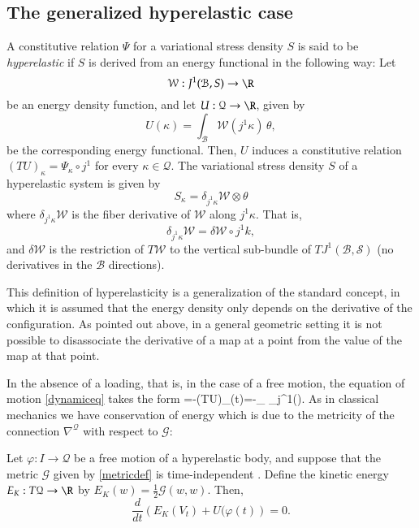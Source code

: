 \documentclass[smallextended]{svjour3}
\begin{document}
\subsection{The generalized hyperelastic case}

A constitutive relation $\Psi$ for a variational stress density $S$ is said to be \emph{hyperelastic}  
if  $S$ is derived from an energy functional in the following way: Let 
\[
{\mathcal{W}} : J^1({\mathcal{B}},S) \to \R
\]
be an energy density function, and let $U:{\mathcal{Q}}\to\R$, given by
\[
U(\kappa)=\int_{\mathcal{B}} {\mathcal{W}}(j^1\kappa)\,\theta,
\]
be the corresponding energy functional. Then, $U$ induces a constitutive relation $(TU)_\kappa=\Psi_\kappa\circ j^1$ for every $\kappa\in{\mathcal{Q}}$.  The variational stress density $S$ of a hyperelastic system is given by 
\[
S_\kappa = \delta_{j^1\kappa}{\mathcal{W}}\otimes\theta
\]
where $\delta_{j^1\kappa}{\mathcal{W}}$ is the fiber derivative of ${\mathcal{W}}$ along $j^1\kappa$. That is, 
\[
\delta_{j^1\kappa}{\mathcal{W}}=\delta{\mathcal{W}}\circ j^1k,
\] 
and $\delta{\mathcal{W}}$ is the restriction of $T{\mathcal{W}}$ to the vertical sub-bundle of $TJ^1({\mathcal{B}},{\mathcal{S}})$ (no derivatives in the ${\mathcal{B}}$ directions).

This definition of hyperelasticity is a generalization of the standard concept, in which it is assumed that the energy density only depends on the derivative of the configuration. As pointed out above, in a general geometric setting it is not possible to disassociate the derivative of a map at a point from the value of the map at that point.

In the absence of a loading, that is, in the case of a free motion, the equation of motion \eqref{dynamiceq} takes the form  
\beq\label{dyneqhe}
=-(TU)_{{\varphi}(t)}=-\int_{} \delta_{j^1\kappa}{}(\cdot)\theta. 
\eeq
As in classical mechanics we have conservation of energy which is due to the metricity of the connection $\nabla^{\mathcal{Q}}$ with respect to ${\mathcal{G}}$:

\begin{proposition}
Let ${\varphi}:I\to{\mathcal{Q}}$ be a free motion of a hyperelastic body, and suppose that the metric ${\mathcal{G}}$ given by \eqref{metricdef} is time-independent . Define the kinetic energy $E_K:T{\mathcal{Q}}\to\R$ by $E_K(w)=\frac{1}{2}{\mathcal{G}}(w,w)$. Then, 
\[
\frac{d}{dt}\left(E_K(V_t)+U({\varphi}(t)\right)=0.
\]  
\end{proposition}
\end{document}
